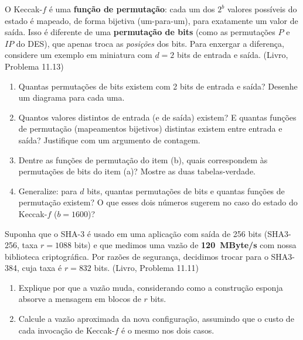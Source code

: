 \documentclass[11pt,a4paper]{article}
\newcommand{\livro}[1]{{\footnotesize\color{black!50}(Livro, Problema #1)}}
\begin{document}
\begin{exercicio}
O Keccak-$f$ \'{e} uma \textbf{fun\c{c}\~{a}o de permuta\c{c}\~{a}o}: cada um dos $2^{b}$ valores poss\'{i}veis do estado \'{e} mapeado, de forma bijetiva (um-para-um), para exatamente um valor de sa\'{i}da. Isso \'{e} diferente de uma \textbf{permuta\c{c}\~{a}o de bits} (como as permuta\c{c}\~{o}es $P$ e $IP$ do DES), que apenas troca as \emph{posi\c{c}\~{o}es} dos bits. Para enxergar a diferen\c{c}a, considere um exemplo em miniatura com $d = 2$ bits de entrada e sa\'{i}da. \livro{11.13}
\begin{enumerate}[label=(\alph*)]
    \item Quantas permuta\c{c}\~{o}es de bits existem com 2 bits de entrada e sa\'{i}da? Desenhe um diagrama para cada uma.
    \item Quantos valores distintos de entrada (e de sa\'{i}da) existem? E quantas fun\c{c}\~{o}es de permuta\c{c}\~{a}o (mapeamentos bijetivos) distintas existem entre entrada e sa\'{i}da? Justifique com um argumento de contagem.
    \item Dentre as fun\c{c}\~{o}es de permuta\c{c}\~{a}o do item (b), quais correspondem \`{a}s permuta\c{c}\~{o}es de bits do item (a)? Mostre as duas tabelas-verdade.
    \item Generalize: para $d$ bits, quantas permuta\c{c}\~{o}es de bits e quantas fun\c{c}\~{o}es de permuta\c{c}\~{a}o existem? O que esses dois n\'{u}meros sugerem no caso do estado do Keccak-$f$ ($b = 1600$)?
\end{enumerate}
\end{exercicio}

\begin{exercicio}
Suponha que o SHA-3 \'{e} usado em uma aplica\c{c}\~{a}o com sa\'{i}da de 256 bits (SHA3-256, taxa $r = 1088$ bits) e que medimos uma vaz\~{a}o de \textbf{120~MByte/s} com nossa biblioteca criptogr\'{a}fica. Por raz\~{o}es de seguran\c{c}a, decidimos trocar para o SHA3-384, cuja taxa \'{e} $r = 832$ bits. \livro{11.11}
\begin{enumerate}[label=(\alph*)]
    \item Explique por que a vaz\~{a}o muda, considerando como a constru\c{c}\~{a}o esponja absorve a mensagem em blocos de $r$ bits.
    \item Calcule a vaz\~{a}o aproximada da nova configura\c{c}\~{a}o, assumindo que o custo de cada invoca\c{c}\~{a}o de Keccak-$f$ \'{e} o mesmo nos dois casos.
\end{enumerate}
\end{exercicio}
\end{document}
